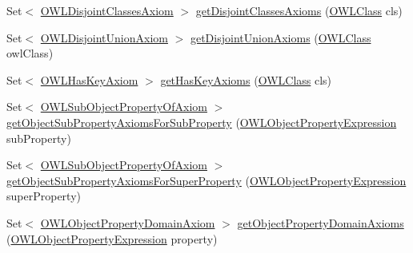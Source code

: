 \begin{DoxyCompactItemize}
\item 
Set$<$ \hyperlink{interfaceorg_1_1semanticweb_1_1owlapi_1_1model_1_1_o_w_l_disjoint_classes_axiom}{O\-W\-L\-Disjoint\-Classes\-Axiom} $>$ \hyperlink{interfaceorg_1_1semanticweb_1_1owlapi_1_1model_1_1_o_w_l_ontology_a19a87cdd3287f6f4ac736499591a69c1}{get\-Disjoint\-Classes\-Axioms} (\hyperlink{interfaceorg_1_1semanticweb_1_1owlapi_1_1model_1_1_o_w_l_class}{O\-W\-L\-Class} cls)
\item 
Set$<$ \hyperlink{interfaceorg_1_1semanticweb_1_1owlapi_1_1model_1_1_o_w_l_disjoint_union_axiom}{O\-W\-L\-Disjoint\-Union\-Axiom} $>$ \hyperlink{interfaceorg_1_1semanticweb_1_1owlapi_1_1model_1_1_o_w_l_ontology_a38e119c5a6a7ee322c2c833a4bf2f497}{get\-Disjoint\-Union\-Axioms} (\hyperlink{interfaceorg_1_1semanticweb_1_1owlapi_1_1model_1_1_o_w_l_class}{O\-W\-L\-Class} owl\-Class)
\item 
Set$<$ \hyperlink{interfaceorg_1_1semanticweb_1_1owlapi_1_1model_1_1_o_w_l_has_key_axiom}{O\-W\-L\-Has\-Key\-Axiom} $>$ \hyperlink{interfaceorg_1_1semanticweb_1_1owlapi_1_1model_1_1_o_w_l_ontology_aab8e452dd05664d63c4bcf9cea86cbb5}{get\-Has\-Key\-Axioms} (\hyperlink{interfaceorg_1_1semanticweb_1_1owlapi_1_1model_1_1_o_w_l_class}{O\-W\-L\-Class} cls)
\item 
Set$<$ \hyperlink{interfaceorg_1_1semanticweb_1_1owlapi_1_1model_1_1_o_w_l_sub_object_property_of_axiom}{O\-W\-L\-Sub\-Object\-Property\-Of\-Axiom} $>$ \hyperlink{interfaceorg_1_1semanticweb_1_1owlapi_1_1model_1_1_o_w_l_ontology_a4ad6118bab9e71734070a2905d6c249b}{get\-Object\-Sub\-Property\-Axioms\-For\-Sub\-Property} (\hyperlink{interfaceorg_1_1semanticweb_1_1owlapi_1_1model_1_1_o_w_l_object_property_expression}{O\-W\-L\-Object\-Property\-Expression} sub\-Property)
\item 
Set$<$ \hyperlink{interfaceorg_1_1semanticweb_1_1owlapi_1_1model_1_1_o_w_l_sub_object_property_of_axiom}{O\-W\-L\-Sub\-Object\-Property\-Of\-Axiom} $>$ \hyperlink{interfaceorg_1_1semanticweb_1_1owlapi_1_1model_1_1_o_w_l_ontology_a4deb4d050881b762fdb8e7357bd644b2}{get\-Object\-Sub\-Property\-Axioms\-For\-Super\-Property} (\hyperlink{interfaceorg_1_1semanticweb_1_1owlapi_1_1model_1_1_o_w_l_object_property_expression}{O\-W\-L\-Object\-Property\-Expression} super\-Property)
\item 
Set$<$ \hyperlink{interfaceorg_1_1semanticweb_1_1owlapi_1_1model_1_1_o_w_l_object_property_domain_axiom}{O\-W\-L\-Object\-Property\-Domain\-Axiom} $>$ \hyperlink{interfaceorg_1_1semanticweb_1_1owlapi_1_1model_1_1_o_w_l_ontology_ae40272a6f0595f9901221158327b4498}{get\-Object\-Property\-Domain\-Axioms} (\hyperlink{interfaceorg_1_1semanticweb_1_1owlapi_1_1model_1_1_o_w_l_object_property_expression}{O\-W\-L\-Object\-Property\-Expression} property)

\end{DoxyCompactItemize}
